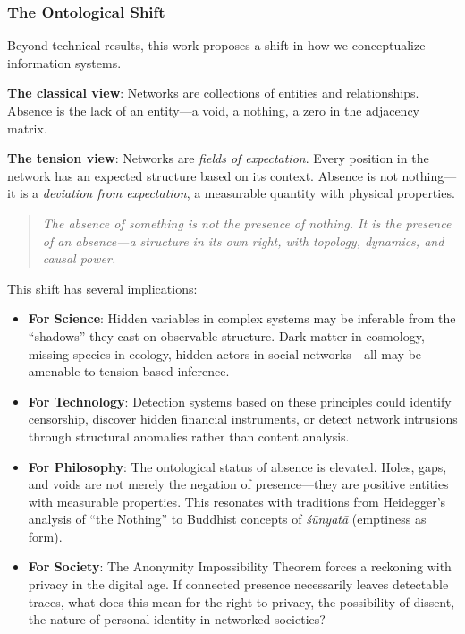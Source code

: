 \documentclass[12pt,a4paper]{article}
\theoremstyle{definition}
\theoremstyle{remark}
\begin{document}
\subsubsection{The Ontological Shift}

Beyond technical results, this work proposes a shift in how we conceptualize information systems.

\textbf{The classical view}: Networks are collections of entities and relationships. Absence is the lack of an entity—a void, a nothing, a zero in the adjacency matrix.

\textbf{The tension view}: Networks are \emph{fields of expectation}. Every position in the network has an expected structure based on its context. Absence is not nothing—it is a \emph{deviation from expectation}, a measurable quantity with physical properties.

\begin{quote}
\textit{The absence of something is not the presence of nothing. It is the presence of an absence—a structure in its own right, with topology, dynamics, and causal power.}
\end{quote}

This shift has several implications:

\begin{itemize}
    \item \textbf{For Science}: Hidden variables in complex systems may be inferable from the ``shadows'' they cast on observable structure. Dark matter in cosmology, missing species in ecology, hidden actors in social networks—all may be amenable to tension-based inference.
    
    \item \textbf{For Technology}: Detection systems based on these principles could identify censorship, discover hidden financial instruments, or detect network intrusions through structural anomalies rather than content analysis.
    
    \item \textbf{For Philosophy}: The ontological status of absence is elevated. Holes, gaps, and voids are not merely the negation of presence—they are positive entities with measurable properties. This resonates with traditions from Heidegger's analysis of ``the Nothing'' to Buddhist concepts of \emph{śūnyatā} (emptiness as form).
    
    \item \textbf{For Society}: The Anonymity Impossibility Theorem forces a reckoning with privacy in the digital age. If connected presence necessarily leaves detectable traces, what does this mean for the right to privacy, the possibility of dissent, the nature of personal identity in networked societies?
\end{itemize}
\end{document}
